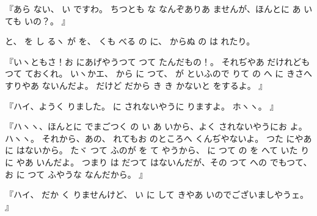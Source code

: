 『あら
ない、
い
ですわ。
ちつとも
な
なんぞありあ
ませんが、ほんとに
あ
いても
いの？。
』

と、
を
し
るヽ
が
を、
くも
べる
の
に、
からぬ
の
は
れたり。

『いヽともさ！お
にあげやうつて
つて
たんだもの！。
それぢやあ
だけれども
つて
ておくれ。
いヽかエ、
から
に
つて、
が
といふので
りて
の
へ
に
きさへすりやあ
ないんだよ。
だけど
だから
き
き
かないと
をするよ。
』

『ハイ、ようく
りました。
に
されないやうに
りますよ。
ホヽヽ。
』

『ハヽヽ、ほんとに
でまごつく
の
い
あ
いから、よく
されないやうにお
よ。
ハヽヽ。
それから、あの、
れてもお
のところへ
くんぢやないよ。
つた
にやあ
に
はないから。
たヾ
つて
ふのが
を
て
やうから、
に
つて
の
を
へて
いた
りに
やあ
いんだよ。
つまり
は
だつて
はないんだが、その
つて
への
でもつて、お
に
つて
ふやうな
なんだから。
』

『ハイ、
だか
く
りませんけど、
い
に
して
きやあ
いのでございましやうェ。
』

